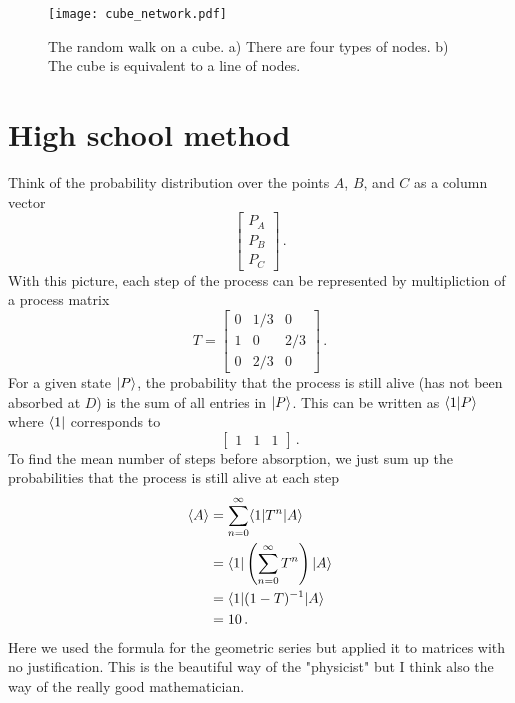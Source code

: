 \documentclass{article}
\begin{document}
\begin{figure}
\begin{centering}
\texttt{[image: cube\_network.pdf]} 
\par\end{centering}
\caption{The random walk on a cube. a) There are four types of nodes. b) The cube is equivalent to a line of nodes.}
\label{Fig:cubeNetwork}
\end{figure}


\section{High school method}

Think of the probability distribution over the points $A$, $B$, and $C$ as a column vector
\begin{equation}
\left[ \begin{matrix} P_A \\ P_B \\ P_C \end{matrix} \right] \, .
\end{equation}
With this picture, each step of the process can be represented by multipliction of a process matrix
\begin{equation}
T = \left[ \begin{matrix} 0 & 1/3 & 0 \\ 1 & 0 & 2/3 \\ 0 & 2/3 & 0 \end{matrix} \right] \, .
\end{equation}
For a given state $| P \rangle$, the probability that the process is still alive (has not been absorbed at $D$) is the sum of all entries in $| P \rangle$.
This can be written as $\langle 1|P\rangle$ where $\langle 1 |$ corresponds to \begin{equation}
\left[ \begin{matrix} 1 & 1 & 1 \end{matrix} \right] \, .
\end{equation}
To find the mean number of steps before absorption, we just sum up the probabilities that the process is still alive at each step \begin{align*}
\langle A \rangle &= \sum_{n=0}^{\infty} \langle 1 | T^n | A \rangle \\
&= \langle 1 | \left( \sum_{n=0}^{\infty} T^n \right) | A \rangle \\
&= \langle 1 | (1-T)^{-1} | A \rangle \\
&= 10 \, .
\end{align*}
Here we used the formula for the geometric series but applied it to matrices with no justification.
This is the beautiful way of the "physicist" but I think also the way of the really good mathematician.
\end{document}
